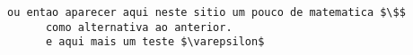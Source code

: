 \documentclass[11pt,a4paper]{report}%
\begin{document}
\begin{lstlisting}[caption={Exemplo de uma Listagem}, label={lstExe1}]
      ou entao aparecer aqui neste sitio um pouco de matematica $\$$
      como alternativa ao anterior.
      e aqui mais um teste $\varepsilon$
\end{lstlisting}

\newpage



\end{document}
